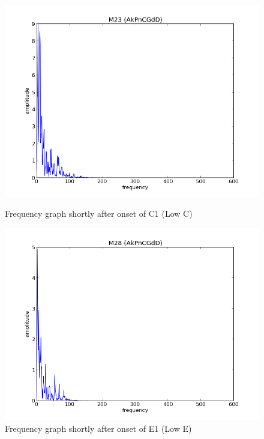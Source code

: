 \documentclass{article}
\begin{document}
\begin{figure}
\includegraphics[scale=.4]{singlefreq_m23.png}
\caption{Frequency graph shortly after onset of C1 (Low C)}
\includegraphics[scale=.4]{singlefreq_m28.png}
\caption{Frequency graph shortly after onset of E1 (Low E)}
\label{fig:single_freqs}
\end{figure}



\end{document}
